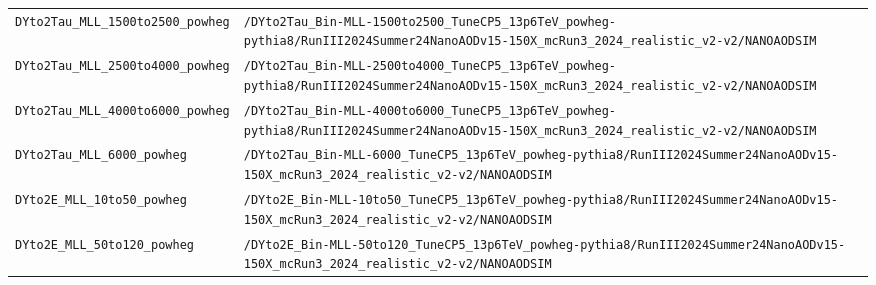 \begin{longtable}{@{}>{\RaggedRight\arraybackslash}p{} >{\RaggedRight\arraybackslash}p{}@{}}
\addlinespace[2pt]
\texttt{DYto2Tau\_\allowbreak{}MLL\_\allowbreak{}1500to2500\_\allowbreak{}powheg} & \texttt{/\allowbreak{}DYto2Tau\_\allowbreak{}Bin-\allowbreak{}MLL-\allowbreak{}1500to2500\_\allowbreak{}TuneCP5\_\allowbreak{}13p6TeV\_\allowbreak{}powheg-\allowbreak{}pythia8/\allowbreak{}RunIII2024Summer24NanoAODv15-\allowbreak{}150X\_\allowbreak{}mcRun3\_\allowbreak{}2024\_\allowbreak{}realistic\_\allowbreak{}v2-\allowbreak{}v2/\allowbreak{}NANOAODSIM} \\
\addlinespace[2pt]
\texttt{DYto2Tau\_\allowbreak{}MLL\_\allowbreak{}2500to4000\_\allowbreak{}powheg} & \texttt{/\allowbreak{}DYto2Tau\_\allowbreak{}Bin-\allowbreak{}MLL-\allowbreak{}2500to4000\_\allowbreak{}TuneCP5\_\allowbreak{}13p6TeV\_\allowbreak{}powheg-\allowbreak{}pythia8/\allowbreak{}RunIII2024Summer24NanoAODv15-\allowbreak{}150X\_\allowbreak{}mcRun3\_\allowbreak{}2024\_\allowbreak{}realistic\_\allowbreak{}v2-\allowbreak{}v2/\allowbreak{}NANOAODSIM} \\
\addlinespace[2pt]
\texttt{DYto2Tau\_\allowbreak{}MLL\_\allowbreak{}4000to6000\_\allowbreak{}powheg} & \texttt{/\allowbreak{}DYto2Tau\_\allowbreak{}Bin-\allowbreak{}MLL-\allowbreak{}4000to6000\_\allowbreak{}TuneCP5\_\allowbreak{}13p6TeV\_\allowbreak{}powheg-\allowbreak{}pythia8/\allowbreak{}RunIII2024Summer24NanoAODv15-\allowbreak{}150X\_\allowbreak{}mcRun3\_\allowbreak{}2024\_\allowbreak{}realistic\_\allowbreak{}v2-\allowbreak{}v2/\allowbreak{}NANOAODSIM} \\
\addlinespace[2pt]
\texttt{DYto2Tau\_\allowbreak{}MLL\_\allowbreak{}6000\_\allowbreak{}powheg} & \texttt{/\allowbreak{}DYto2Tau\_\allowbreak{}Bin-\allowbreak{}MLL-\allowbreak{}6000\_\allowbreak{}TuneCP5\_\allowbreak{}13p6TeV\_\allowbreak{}powheg-\allowbreak{}pythia8/\allowbreak{}RunIII2024Summer24NanoAODv15-\allowbreak{}150X\_\allowbreak{}mcRun3\_\allowbreak{}2024\_\allowbreak{}realistic\_\allowbreak{}v2-\allowbreak{}v2/\allowbreak{}NANOAODSIM} \\
\addlinespace[2pt]
\texttt{DYto2E\_\allowbreak{}MLL\_\allowbreak{}10to50\_\allowbreak{}powheg} & \texttt{/\allowbreak{}DYto2E\_\allowbreak{}Bin-\allowbreak{}MLL-\allowbreak{}10to50\_\allowbreak{}TuneCP5\_\allowbreak{}13p6TeV\_\allowbreak{}powheg-\allowbreak{}pythia8/\allowbreak{}RunIII2024Summer24NanoAODv15-\allowbreak{}150X\_\allowbreak{}mcRun3\_\allowbreak{}2024\_\allowbreak{}realistic\_\allowbreak{}v2-\allowbreak{}v2/\allowbreak{}NANOAODSIM} \\
\addlinespace[2pt]
\texttt{DYto2E\_\allowbreak{}MLL\_\allowbreak{}50to120\_\allowbreak{}powheg} & \texttt{/\allowbreak{}DYto2E\_\allowbreak{}Bin-\allowbreak{}MLL-\allowbreak{}50to120\_\allowbreak{}TuneCP5\_\allowbreak{}13p6TeV\_\allowbreak{}powheg-\allowbreak{}pythia8/\allowbreak{}RunIII2024Summer24NanoAODv15-\allowbreak{}150X\_\allowbreak{}mcRun3\_\allowbreak{}2024\_\allowbreak{}realistic\_\allowbreak{}v2-\allowbreak{}v2/\allowbreak{}NANOAODSIM} \\

\end{longtable}
